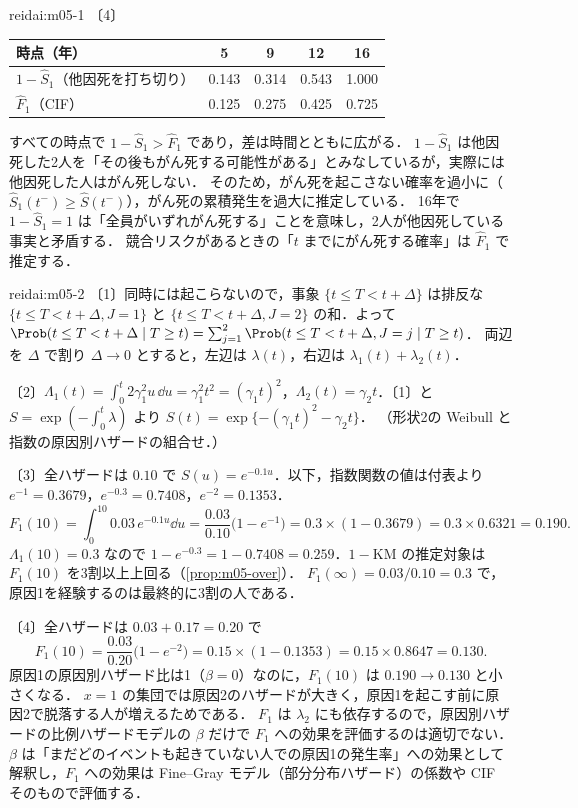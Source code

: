 \begin{kaitou}{reidai:m05-1}
〔4〕
\begin{center}\small
\begin{tabular}{@{}lcccc@{}}
\toprule
時点（年） & 5 & 9 & 12 & 16\\
\midrule
$1-\hat S_1$（他因死を打ち切り） & 0.143 & 0.314 & 0.543 & 1.000\\
$\hat F_1$（CIF） & 0.125 & 0.275 & 0.425 & 0.725\\
\bottomrule
\end{tabular}
\end{center}
すべての時点で $1-\hat S_1>\hat F_1$ であり，差は時間とともに広がる．
$1-\hat S_1$ は他因死した2人を「その後もがん死する可能性がある」とみなしているが，実際には他因死した人はがん死しない．
そのため，がん死を起こさない確率を過小に（$\hat S_1(t^-)\ge\hat S(t^-)$），がん死の累積発生を過大に推定している．
16年で $1-\hat S_1=1$ は「全員がいずれがん死する」ことを意味し，2人が他因死している事実と矛盾する．
競合リスクがあるときの「$t$ までにがん死する確率」は $\hat F_1$ で推定する．
\end{kaitou}

\begin{kaitou}{reidai:m05-2}
〔1〕同時には起こらないので，事象 $\{t\le T<t+\Delta\}$ は排反な $\{t\le T<t+\Delta,J=1\}$ と $\{t\le T<t+\Delta,J=2\}$ の和．よって
$\Prob(t\le T<t+\Delta\mid T\ge t)=\sum_{j=1}^2\Prob(t\le T<t+\Delta,J=j\mid T\ge t)$．
両辺を $\Delta$ で割り $\Delta\to0$ とすると，左辺は $\lambda(t)$，右辺は $\lambda_1(t)+\lambda_2(t)$．

〔2〕$\Lambda_1(t)=\int_0^t2\gamma_1^2u\,\dd u=\gamma_1^2t^2=(\gamma_1t)^2$，$\Lambda_2(t)=\gamma_2t$．〔1〕と $S=\exp(-\int_0^t\lambda)$ より
$S(t)=\exp\{-(\gamma_1t)^2-\gamma_2t\}$．
（形状2の Weibull と指数の原因別ハザードの組合せ．）

〔3〕全ハザードは $0.10$ で $S(u)=e^{-0.1u}$．以下，指数関数の値は付表より $e^{-1}=0.3679$，$e^{-0.3}=0.7408$，$e^{-2}=0.1353$．
\[
F_1(10)=\int_0^{10}0.03\,e^{-0.1u}\dd u=\frac{0.03}{0.10}\bigl(1-e^{-1}\bigr)=0.3\times(1-0.3679)=0.3\times0.6321=0.190 .
\]
$\Lambda_1(10)=0.3$ なので $1-e^{-0.3}=1-0.7408=0.259$．$1-\mathrm{KM}$ の推定対象は $F_1(10)$ を3割以上上回る（\cref{prop:m05-over}）．
$F_1(\infty)=0.03/0.10=0.3$ で，原因1を経験するのは最終的に3割の人である．

〔4〕全ハザードは $0.03+0.17=0.20$ で
\[
F_1(10)=\frac{0.03}{0.20}\bigl(1-e^{-2}\bigr)=0.15\times(1-0.1353)=0.15\times0.8647=0.130 .
\]
原因1の原因別ハザード比は1（$\beta=0$）なのに，$F_1(10)$ は $0.190\to0.130$ と小さくなる．
$x=1$ の集団では原因2のハザードが大きく，原因1を起こす前に原因2で脱落する人が増えるためである．
$F_1$ は $\lambda_2$ にも依存するので，原因別ハザードの比例ハザードモデルの $\beta$ だけで $F_1$ への効果を評価するのは適切でない．
$\beta$ は「まだどのイベントも起きていない人での原因1の発生率」への効果として解釈し，$F_1$ への効果は Fine--Gray モデル（部分分布ハザード）の係数や CIF そのもので評価する．
\end{kaitou}

